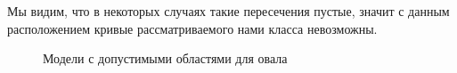 \documentclass[11pt]{book}
\numberwithin{exercise}{chapter}
\begin{document}
\begin{figure}[H]
\caption{}
\label{fig:intersection_of_fields}
\end{figure}

Мы видим, что в некоторых случаях такие пересечения пустые, значит с данным расположением кривые рассматриваемого нами класса невозможны.

\begin{figure}[H]
\caption{Модели с допустимыми областями для овала}
\label{fig:curves_with_ovals}
\end{figure}
\end{document}
